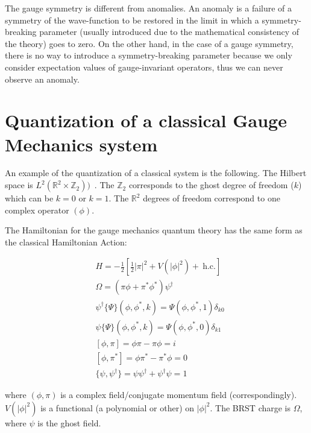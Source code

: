 \documentclass[11pt]{book}
\begin{document}
The gauge symmetry is different from anomalies. An anomaly is a failure
of a symmetry of the wave-function to be restored in the limit in which
a symmetry-breaking parameter (usually introduced due to the
mathematical consistency of the theory) goes to zero. On the other hand,
in the case of a gauge symmetry, there is no way to introduce a
symmetry-breaking parameter because we only consider expectation values
of gauge-invariant operators, thus we can never observe an anomaly.

\hypertarget{quantization-of-a-classical-gauge-mechanics-system}{%
\section{Quantization of a classical Gauge Mechanics
system}\label{quantization-of-a-classical-gauge-mechanics-system}}

An example of the quantization of a classical system is the following.
The Hilbert space is
\(L^2(\mathbb{R}^2\times\mathbb{Z}_2))\)~\cite{Petz:1990gb}\cite{Fock}. The \(\mathbb{Z}_2\)
corresponds to the ghost degree of freedom (\(k\)) which can be \(k=0\)
or \(k=1\). The \(\mathbb{R}^2\) degrees of freedom correspond to one
complex operator \((\phi)\).

The Hamiltonian for the gauge mechanics quantum theory has the same form
as the classical Hamiltonian Action:

\begin{equation}\begin{aligned}
&H=-\frac{1}{2}\left[\frac{1}{2}|\pi|^2+V(|\phi|^2)+\ \mathrm{h.c.}\right]\\
&\Omega=(\pi\phi+\pi^*\phi^*)\psi^\dagger\\
&\psi^\dagger\{\Psi\}(\phi,\phi^*,k)= \Psi(\phi,\phi^*,1)\delta_{k 0}\\
&\psi\{\Psi\}(\phi,\phi^*,k)=  \Psi(\phi,\phi^*,0)\delta_{k 1}\\
&[\phi,\pi]=\phi\pi-\pi \phi=i\\
&[\phi,\pi^*]=\phi\pi^*-\pi^* \phi=0\\
&\{\psi,\psi^\dagger\}=\psi \psi^\dagger+\psi^\dagger\psi=1
\end{aligned}\end{equation}

where \((\phi,\pi)\) is a complex field/conjugate momentum field
(correspondingly). \(V(|\phi|^2)\) is a functional (a polynomial or
other) on \(|\phi|^2\). The BRST charge is \(\Omega\), where \(\psi\) is
the ghost field.
\end{document}
